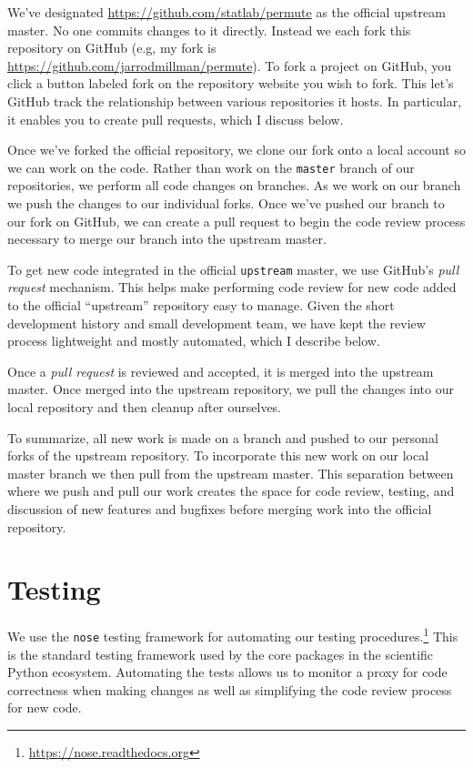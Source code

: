 We've designated \url{https://github.com/statlab/permute} as the official
upstream master.  No one commits changes to it directly.  Instead we each fork
this repository on GitHub (e.g, my fork is
\url{https://github.com/jarrodmillman/permute}).  To fork a project on GitHub,
you click a button labeled fork on the repository website you wish to fork.
This let's GitHub track the relationship between various repositories it hosts.
In particular, it enables you to create pull requests, which I discuss below.

Once we've forked the official repository, we clone our fork onto a local
account so we can work on the code.  Rather than work on the \texttt{master}
branch of our repositories, we perform all code changes on branches.  As
we work on our branch we push the changes to our individual forks.  Once
we've pushed our branch to our fork on GitHub, we can create a pull request
to begin the code review process necessary to merge our branch into the
upstream master.

To get new code integrated in the official \texttt{upstream} master, we use
GitHub's \emph{pull request} mechanism.  This helps make performing code review
for new code added to the official ``upstream'' repository easy to manage.
Given the short development history and small development team, we have
kept the review process lightweight and mostly automated, which I describe
below.

Once a \emph{pull request} is reviewed and accepted, it is merged into
the upstream master.  Once merged into the upstream repository, we pull
the changes into our local repository and then cleanup after ourselves.

To summarize, all new work is made on a branch and pushed to our
personal forks of the upstream repository. To incorporate this new
work on our local master branch we then pull from the upstream
master.  This separation between where we push and pull our
work creates the space for code review, testing, and discussion of
new features and bugfixes before merging work into the official 
repository.

\section{\label{sec:test}Testing}

We use the \texttt{nose} testing framework for automating our testing
procedures.\footnote{\url{https://nose.readthedocs.org}}  This is the standard
testing framework used by the core packages in the scientific Python ecosystem.
Automating the tests allows us to monitor a proxy for code correctness when
making changes as well as simplifying the code review process for new code. 

